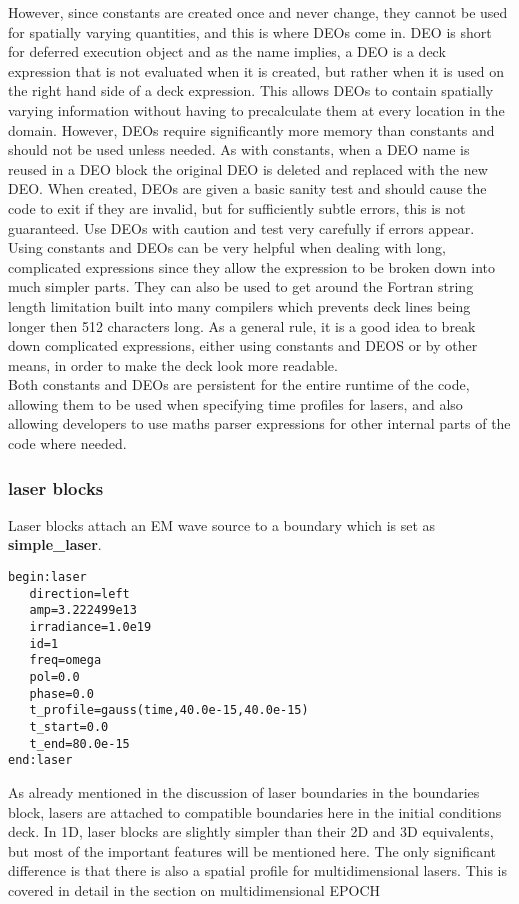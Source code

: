 \documentclass[12pt]{article}
\newcommand{\inlineemph}{\color{warwicklight} \bf}
\newcommand{\boxverbatim}[1]{\begin{Verbatim}[obeytabs=true,frame=single,
  framerule=0.5mm,rulecolor=\color{warwickmid},label=#1]}
\newcommand{\EPOCH}{{\color{warwickdark}\fontfamily{phv}\selectfont EPOCH} }
\begin{document}
However, since constants are created once and never change, they cannot be used
for spatially varying quantities, and this is where DEOs come in. DEO is short
for deferred execution object and as the name implies, a DEO is a deck
expression that is not evaluated when it is created, but rather when it is used
on the right hand side of a deck expression. This allows DEOs to contain
spatially varying information without having to precalculate them at every
location in the domain. However, DEOs require significantly more memory than
constants and should not be used unless needed. As with constants, when a DEO
name is reused in a DEO block the original DEO is deleted and replaced with the
new DEO. When created, DEOs are given a basic sanity test and should cause the
code to exit if they are invalid, but for sufficiently subtle errors, this is
not guaranteed. Use DEOs with caution and test very carefully if errors
appear.\\

Using constants and DEOs can be very helpful when dealing with long,
complicated expressions since they allow the expression to be broken down into
much simpler parts. They can also be used to get around the Fortran string
length limitation built into many compilers which prevents deck lines being
longer then 512 characters long. As a general rule, it is a good idea to break
down complicated expressions, either using constants and DEOS or by other
means, in order to make the deck look more readable.\\

Both constants and DEOs are persistent for the entire runtime of the code,
allowing them to be used when specifying time profiles for lasers, and also
allowing developers to use maths parser expressions for other internal parts of
the code where needed.
\pagebreak

\subsubsection{{\inlineemph laser} blocks}
Laser blocks attach an EM wave source to a boundary which is set as
{\inlineemph simple\_laser}.

\boxverbatim{laser block}
begin:laser
   direction=left
   amp=3.222499e13
   irradiance=1.0e19
   id=1
   freq=omega
   pol=0.0
   phase=0.0
   t_profile=gauss(time,40.0e-15,40.0e-15)
   t_start=0.0
   t_end=80.0e-15
end:laser
\end{Verbatim}

As already mentioned in the discussion of laser boundaries in the boundaries
block, lasers are attached to compatible boundaries here in the initial
conditions deck. In 1D, laser blocks are slightly simpler than their 2D and 3D
equivalents, but most of the important features will be mentioned here. The
only significant difference is that there is also a spatial profile for
multidimensional lasers. This is covered in detail in the section on
multidimensional \EPOCH\\
\end{document}
